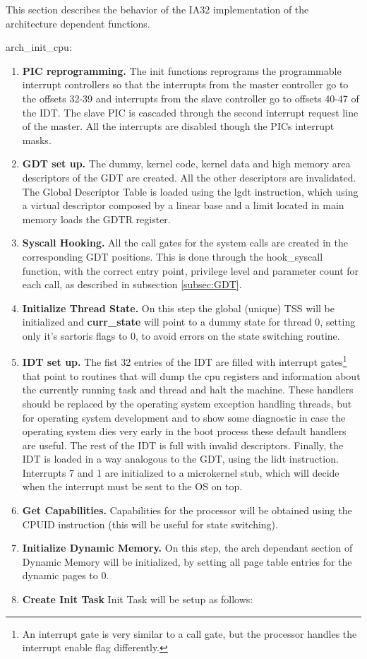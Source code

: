 \documentclass[11pt, letterpaper, twoside, english]{book}
\begin{document}
This section describes the behavior of the IA32 implementation of the architecture dependent functions.

\textsf{arch\_init\_cpu}: 
\begin{enumerate}
\item[]\textbf{PIC reprogramming.} The init functions reprograms the programmable interrupt controllers so that the interrupts from the master controller go to the offsets 32-39 and interrupts from the slave controller go to offsets 40-47 of the IDT. The slave PIC is cascaded through the second interrupt request line of the master. All the interrupts are disabled though the PICs interrupt masks.
\item[]\textbf{GDT set up.} The dummy, kernel code, kernel data and high memory area descriptors of the GDT are created. All the other descriptors are invalidated. The Global Descriptor Table is loaded using the \textsf{lgdt} instruction, which using a virtual descriptor composed by a linear base and a limit located in main memory loads the GDTR register.
\item[]\textbf{Syscall Hooking.} All the call gates for the system calls are created in the corresponding GDT positions. This is done through the \textsf{hook\_syscall} function, with the correct entry point, privilege level and parameter count for each call, as described in subsection \ref{subsec:GDT}.
\item[]\textbf{Initialize Thread State.} On this step the global (unique) TSS will be initialized and \textbf{curr\_state} will point to a dummy state for thread 0, setting only it's sartoris flags to 0, to avoid errors on the state switching routine.
\item[]\textbf{IDT set up.} The fist 32 entries of the IDT are filled with interrupt gates\footnote{An interrupt gate is very similar to a call gate, but the processor handles the interrupt enable flag differently.} that point to routines that will dump the cpu registers and information about the currently running task and thread and halt the machine. These handlers should be replaced by the operating system exception handling threads, but for operating system development and to show some diagnostic in case the operating system dies very early in the boot process these default handlers are useful. The rest of the IDT is full with invalid descriptors. Finally, the IDT is loaded in a way analogous to the GDT, using the \textsf{lidt} instruction. Interrupts 7 and 1 are initialized to a microkernel stub, which will decide when the interrupt must be sent to the OS on top.
\item[]\textbf{Get Capabilities.} Capabilities for the processor will be obtained using the CPUID instruction (this will be useful for state switching).
\item[]\textbf{Initialize Dynamic Memory.} On this step, the arch dependant section of Dynamic Memory will be initialized, by setting all page table entries for the dynamic pages to 0.
\item[]\textbf{Create Init Task} Init Task will be setup as follows: \\


\end{enumerate}
\end{document}
